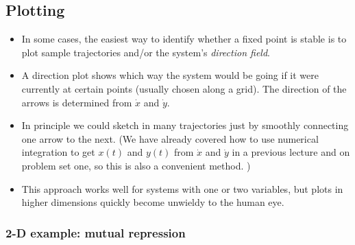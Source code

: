 \documentclass{article}
\begin{document}
\subsection*{Plotting}

\begin{itemize}

\item In some cases, the easiest way to identify whether a fixed point is stable is to plot sample trajectories and/or the system's \textit{direction field}.

\item A direction plot shows which way the system would be going if it were currently at certain points (usually chosen along a grid). The direction of the arrows is determined from  $\dot{x}$ and  $\dot{y}$.

\item In principle we could sketch in many trajectories just by smoothly connecting one arrow to the next. (We have already covered how to use numerical integration to get $x(t)$ and $y(t)$ from $\dot{x}$ and $\dot{y}$ in a previous lecture and on problem set one, so this is also a convenient method. )

\item This approach works well for systems with one or two variables, but plots in higher dimensions quickly become unwieldy to the human eye.

\end{itemize}

\subsubsection*{2-D example: mutual repression}
\end{document}

